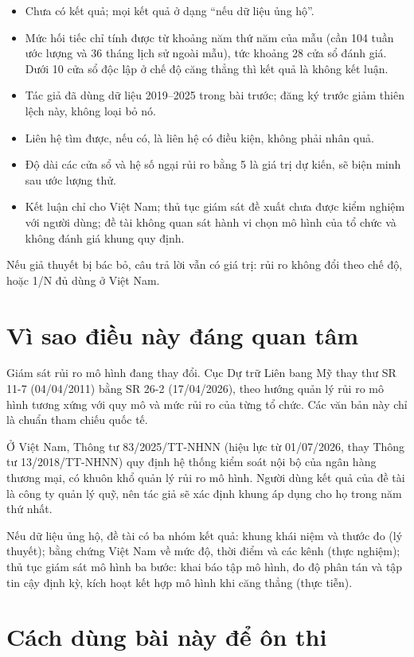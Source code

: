 \begin{itemize}
\item
  Chưa có kết quả; mọi kết quả ở dạng “nếu dữ liệu ủng hộ”.
\item
  Mức hối tiếc chỉ tính được từ khoảng năm thứ năm của mẫu (cần 104 tuần ước lượng và 36 tháng lịch sử ngoài mẫu), tức khoảng 28 cửa sổ đánh giá. Dưới 10 cửa sổ độc lập ở chế độ căng thẳng thì kết quả là không kết luận.
\item
  Tác giả đã dùng dữ liệu 2019--2025 trong bài trước; đăng ký trước giảm thiên lệch này, không loại bỏ nó.
\item
  Liên hệ tìm được, nếu có, là liên hệ có điều kiện, không phải nhân quả.
\item
  Độ dài các cửa sổ và hệ số ngại rủi ro bằng 5 là giá trị dự kiến, sẽ biện minh sau ước lượng thử.
\item
  Kết luận chỉ cho Việt Nam; thủ tục giám sát đề xuất chưa được kiểm nghiệm với người dùng; đề tài không quan sát hành vi chọn mô hình của tổ chức và không đánh giá khung quy định.
\end{itemize}

Nếu giả thuyết bị bác bỏ, câu trả lời vẫn có giá trị: rủi ro không đổi theo chế độ, hoặc 1/N đủ dùng ở Việt Nam.

\section{Vì sao điều này đáng quan tâm}

Giám sát rủi ro mô hình đang thay đổi. Cục Dự trữ Liên bang Mỹ thay thư SR 11-7 (04/04/2011) bằng SR 26-2 (17/04/2026), theo hướng quản lý rủi ro mô hình tương xứng với quy mô và mức rủi ro của từng tổ chức. Các văn bản này chỉ là chuẩn tham chiếu quốc tế.

Ở Việt Nam, Thông tư 83/2025/TT-NHNN (hiệu lực từ 01/07/2026, thay Thông tư 13/2018/TT-NHNN) quy định hệ thống kiểm soát nội bộ của ngân hàng thương mại, có khuôn khổ quản lý rủi ro mô hình. Người dùng kết quả của đề tài là công ty quản lý quỹ, nên tác giả sẽ xác định khung áp dụng cho họ trong năm thứ nhất.

Nếu dữ liệu ủng hộ, đề tài có ba nhóm kết quả: khung khái niệm và thước đo (lý thuyết); bằng chứng Việt Nam về mức độ, thời điểm và các kênh (thực nghiệm); thủ tục giám sát mô hình ba bước: khai báo tập mô hình, đo độ phân tán và tập tin cậy định kỳ, kích hoạt kết hợp mô hình khi căng thẳng (thực tiễn).

\section{Cách dùng bài này để ôn thi}

